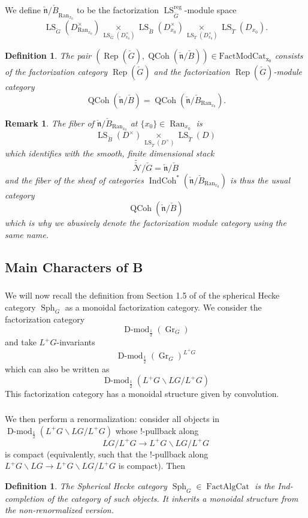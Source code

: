 \documentclass[10pt,a4paper]{amsart}
\newtheorem{defn}[subsubsection]{Definition}
\newtheorem{rem}[subsubsection]{Remark}
\newcommand{\on}[1]{\operatorname{#1}}
\newcommand{\Dmodh}{\on{D-mod}_{\frac{1}{2}}}
\newcommand{\QCoh}{\on{QCoh}}
\newcommand{\IndCoh}{\on{IndCoh}}
\newcommand{\Gcheck}{\check{G}}
\newcommand{\ncheck}{\check{\mathfrak{n}}}
\newcommand{\Bcheck}{\check{B}}
\newcommand{\Tcheck}{\check{T}}
\newcommand{\Ran}{\on{Ran}}
\newcommand{\FactAlgCat}{\on{FactAlgCat}}
\newcommand{\FactModCat}{\on{FactModCat_{x_0}}}
\newcommand{\sssec}[1]{\subsubsection{}}
\begin{document}
We define ${\ncheck/\Bcheck}_{\Ran_{x_0}}$ to be the factorization $\on{LS}_{\Gcheck}^{\on{reg}}$-module space
$$
\on{LS}_{\Gcheck}(D_{\Ran_{x_0}}^{\times}) \underset{\on{LS}_{\Gcheck}(D_{x_0}^{\times})}{\times} \on{LS}_{\Bcheck}(D_{x_0}^{\times}) \underset{\on{LS}_{\Tcheck}(D_{x_0}^{\times})}{\times} \on{LS}_{\Tcheck}(D_{x_0}).
$$

\begin{defn}
    The pair $(\on{Rep}(\Gcheck), \QCoh(\ncheck/\Bcheck)) \in \FactModCat$ consists of the factorization category $\on{Rep}(\Gcheck)$ and the factorization $\on{Rep}(\Gcheck)$-module category
    $$
        \QCoh(\ncheck/\Bcheck) = \QCoh(\ncheck/\Bcheck_{\Ran_{x_0}}).
    $$
\end{defn}

\begin{rem}
    The fiber of $\ncheck/\Bcheck_{\Ran_{x_0}}$ at $\{x_0\} \in \Ran_{x_0}$ is
    $$
        \on{LS}_{\Bcheck}(D^{\times}) \underset{\on{LS}_{\Tcheck}(D^{\times})}{\times} \on{LS}_{\Tcheck}(D)
    $$
    which identifies with the smooth, finite dimensional stack
    $$
    \tilde{\check{\mathcal{N}}}/\check{G} = \ncheck/\Bcheck
    $$
    and the fiber of the sheaf of categories $\IndCoh^*(\ncheck/\Bcheck_{\Ran_{x_0}})$ is thus the usual category
    $$
    \QCoh(\ncheck/\Bcheck)
    $$
    which is why we abusively denote the factorization module category using the same name.
\end{rem}

\subsection{Main Characters of B} \label{Main Characters of B}

\sssec{}
We will now recall the definition from Section 1.5 of \cite{GLC2} of the spherical Hecke category $\on{Sph}_G$ as a monoidal factorization category. We consider the factorization category
$$
\Dmodh(\on{Gr}_{G})
$$
and take $L^+G$-invariants
$$
\Dmodh(\on{Gr}_{G})^{L^+G}
$$
which can also be written as
$$
\Dmodh(L^+G \backslash LG / L^+G)
$$
This factorization category has a monoidal structure given by convolution. 

\sssec{}
We then perform a renormalization: consider all objects in $\Dmodh(L^+G \backslash LG / L^+G)$ whose $!$-pullback along
$$
LG / L^+G \to L^+G \backslash LG/L^+G
$$
is compact (equivalently, such that the $!$-pullback along $L^+G \backslash LG \to L^+G \backslash LG/L^+G$ is compact). Then

\begin{defn}
    The Spherical Hecke category $\on{Sph}_G \in \FactAlgCat$ is the Ind-completion of the category of such objects. It inherits a monoidal structure from the non-renormalized version.
\end{defn}
\end{document}
